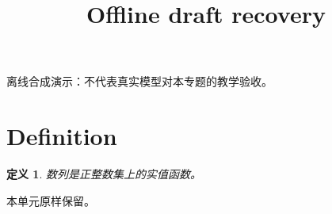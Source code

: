\documentclass[UTF8,fontset=fandol,11pt]{ctexart}
\title{Offline draft recovery}
\date{}
\newtheorem{definition}{定义}[section]
\begin{document}
\maketitle
\par\noindent 离线合成演示：不代表真实模型对本专题的教学验收。\par
\section{Definition}\label{sec:S01}
\begin{definition}
数列是正整数集上的实值函数。
\end{definition}
本单元原样保留。\par
\end{document}
